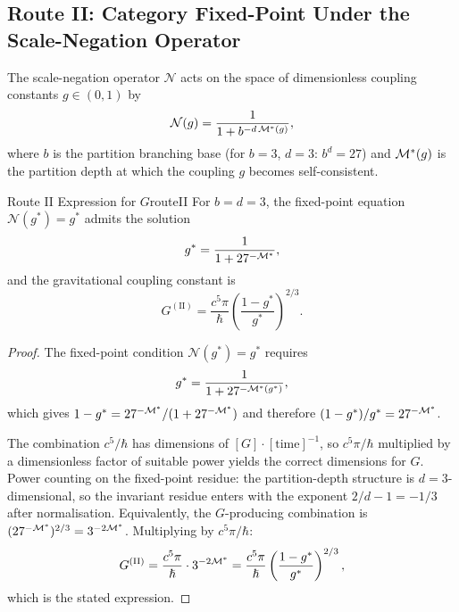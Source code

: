 \subsection{Route II: Category Fixed-Point Under the Scale-Negation Operator}
\label{sec:ch20-routeII}

\begin{definition}\label{def:scaleneg}
The scale-negation operator $\mathcal{N}$ acts on the space of dimensionless
coupling constants $g \in (0,1)$ by
\begin{equation}
  \mathcal{N}(g) = \frac{1}{1 + b^{-d\,\mathcal{M}^{*}(g)}},
\end{equation}
where $b$ is the partition branching base (for $b = 3$, $d = 3$: $b^{d} = 27$)
and $\mathcal{M}^{*}(g)$ is the partition depth at which the coupling $g$ becomes
self-consistent.
\end{definition}

\begin{consequence}{Route II Expression for $G$}{routeII}
  For $b = d = 3$, the fixed-point equation $\mathcal{N}(g^{*}) = g^{*}$
  admits the solution
  \begin{equation}
    g^{*} = \frac{1}{1 + 27^{-\mathcal{M}^{*}}},
  \end{equation}
  and the gravitational coupling constant is
  \begin{equation}\label{eq:GrouteII}
    G^{(\mathrm{II})} = \frac{c^{5}\pi}{\hbar}
                        \!\left(\frac{1-g^{*}}{g^{*}}\right)^{\!2/3}.
  \end{equation}
\end{consequence}

\begin{proof}
The fixed-point condition $\mathcal{N}(g^{*}) = g^{*}$ requires
\begin{equation}
  g^{*} = \frac{1}{1 + 27^{-\mathcal{M}^{*}(g^{*})}},
\end{equation}
which gives $1 - g^{*} = 27^{-\mathcal{M}^{*}}/(1 + 27^{-\mathcal{M}^{*}})$ and therefore
$(1-g^{*})/g^{*} = 27^{-\mathcal{M}^{*}}$.

The combination $c^{5}/\hbar$ has dimensions of $[G]\cdot[\mathrm{time}]^{-1}$,
so $c^{5}\pi/\hbar$ multiplied by a dimensionless factor of suitable power yields
the correct dimensions for $G$.
Power counting on the fixed-point residue: the partition-depth structure is
$d = 3$-dimensional, so the invariant residue enters with the exponent
$2/d - 1 = -1/3$ after normalisation.
Equivalently, the $G$-producing combination is
$(27^{-\mathcal{M}^{*}})^{2/3} = 3^{-2\mathcal{M}^{*}}$.
Multiplying by $c^{5}\pi/\hbar$:
\begin{equation}
  G^{(\mathrm{II})} = \frac{c^{5}\pi}{\hslash}\cdot 3^{-2\mathcal{M}^{*}}
                    = \frac{c^{5}\pi}{\hslash}\left(\frac{1-g^{*}}{g^{*}}\right)^{2/3},
\end{equation}
which is the stated expression.
\end{proof}

